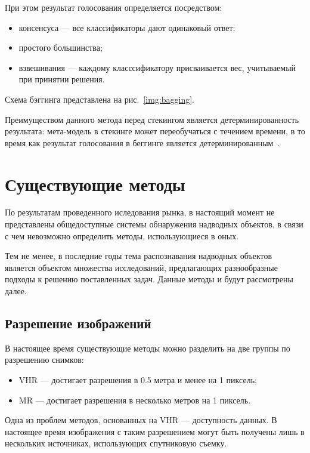 При этом результат голосования определяется посредством:
\begin{itemize}[label=---]
    \item консенсуса --- все классификаторы дают одинаковый ответ;
    \item простого большинства;
    \item взвешивания --- каждому класссификатору присваивается вес, учитываемый при принятии решения.
\end{itemize}

Схема бэггинга представлена на рис.~\ref{img:bagging}.


Преимуществом данного метода перед стекингом является детерминированность результата: мета-модель в стекинге может переобучаться с течением времени, в то время как результат голосования в беггинге является детерминированным~\cite{ensembles}.

\section{Существующие методы}

По результатам проведенного иследования рынка, в настоящий момент не представлены общедоступные системы обнаружения надводных объектов, в связи с чем невозможно определить методы, использующиеся в оных. 

Тем не менее, в последние годы тема распознавания надводных объектов является объектом множества исследований, предлагающих разнообразные подходы к решению поставленных задач. Данные методы и будут рассмотрены далее.

\subsection{Разрешение изображений}

В настоящее время существующие методы можно разделить на две группы по разрешению снимков:

\begin{itemize}[label=---]
    \item VHR --- достигает разрешения в 0.5 метра и менее на 1 пиксель;
    \item MR --- достигает разрешения в несколько метров на 1 пиксель.
\end{itemize}

Одна из проблем методов, основанных на VHR --- доступность данных. В настоящее время изображения с таким разрешением могут быть получены лишь в нескольких источниках, использующих спутниковую съемку.

